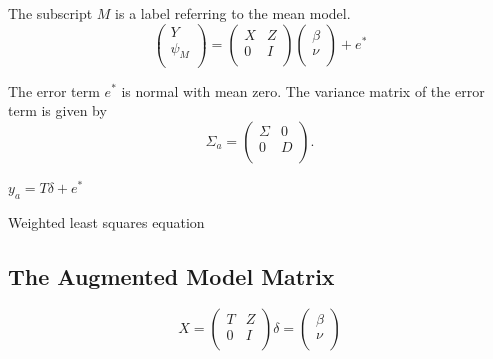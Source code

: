 \documentclass[12pt, a4paper]{report}
\theoremstyle{plain}
\theoremstyle{definition}
\theoremstyle{remark}
\begin{document}
	The subscript $M$ is a label referring to the mean model.
	\begin{equation}
	\left(%
	\begin{array}{c}
	Y \\
	\psi_{M} \\
	\end{array}%
	\right) = \left(
	\begin{array}{cc}
	X & Z \\
	0 & I \\
	\end{array}\right) \left(%
	\begin{array}{c}
	\beta \\
	\nu \\
	\end{array}%
	\right)+ e^{*}
	\end{equation}
	
	
	
	
	The error term $e^{*}$ is normal with mean zero. The variance matrix of the error term is given by
	\begin{equation}
	\Sigma_{a} = \left(%
	\begin{array}{cc}
	\Sigma & 0 \\
	0 & D \\
	\end{array}%
	\right).
	\end{equation}
	
	$y_{a} = T \delta + e^{*}$
	
	Weighted least squares equation
	
	
	
	
	\subsection{The Augmented Model Matrix}  %
	\begin{equation}
	X = \left(%
	\begin{array}{cc}
	T & Z \\
	0 & I \\
	\end{array}%
	\right)
	\delta = \left(%
	\begin{array}{c}
	\beta  \\
	\nu  \\
	\end{array}%
	\right)
	\end{equation}
	
	
	
	
	
\end{document}
